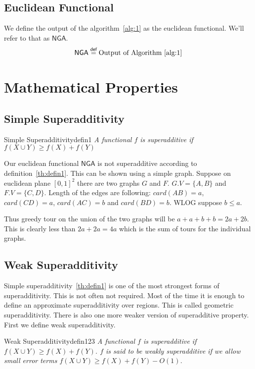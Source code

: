 \documentclass{article}
\begin{document}
\subsection{Euclidean Functional}
We define the output of the algorithm~\ref{alg:1} as the euclidean functional. We'll refer to that as $\textsf{NGA}$.
\begin{align*}
    \textsf{NGA} \stackrel{\textsf{def}}{=} \text{Output of Algorithm~\ref{alg:1}}
\end{align*}

\section{Mathematical Properties}
\subsection{Simple Superadditivity}

\begin{define}{Simple Superadditivity}{defin1}
    \textit{A functional $f$ is superadditive if $f(X \cup Y) \geq f(X) + f(Y)$}
\end{define}

Our euclidean functional $\textsf{NGA}$ is not superadditive according to definition~\ref{th:defin1}.
This can be shown using a simple graph. Suppose on euclidean plane $[0, 1]^2$ there are two graphs $G$ and $F$.
$G.V = \{A, B\}$ and $F.V = \{C, D\}$. Length of the edges are following: $card(AB) = a$, $card(CD) = a$, $card(AC) = b$ and $card(BD) = b$.
WLOG suppose $b \leq a$.

Thus greedy tour on the union of the two graphs will be $a + a + b + b = 2a + 2b$. 
This is clearly less than $2a + 2a = 4a$ which is the sum of tours for the individual graphs.

\subsection*{Weak Superadditivity}

Simple superadditivity~\ref{th:defin1} is one of the most strongest forms of superadditivity.
This is not often not required. Most of the time it is enough to define an approximate 
superadditivity over regions. This is called geometric superadditivity. There is also one 
more weaker version of superadditive property. First we define weak superadditivity.

\begin{define}{Weak Superadditivity}{defin123}
    \textit{A functional $f$ is superadditive if $f(X \cup Y) \ge f(X) + f(Y) $. 
    $f$ is said to be weakly superadditive if we allow small error terms
    $f(X \cup Y) \ge f(X) + f(Y) - O(1)$.}
\end{define}
\end{document}
